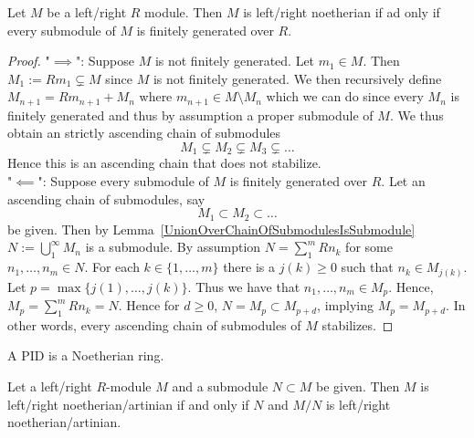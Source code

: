 \begin{theorem}\label{NoetherianIffEverySubmoduleFinitelyGenerated}
    Let $M$ be a left/right $R$ module. Then $M$ is left/right noetherian if ad only if every submodule of $M$ is finitely generated over $R$.
\end{theorem}
\begin{proof}
    "$\implies$": Suppose $M$ is not finitely generated. Let $m_1\in M$. Then $M_1:= Rm_1 \subsetneq M$ since $M$ is not finitely generated. We then recursively define $M_{n+1} = Rm_{n+1} +M_n$ where $m_{n+1}\in M\setminus M_n$ which we can do since every $M_n$ is finitely generated and thus by assumption a proper submodule of $M$. We thus obtain an strictly ascending chain of submodules
    $$M_1\subsetneq M_2\subsetneq M_3\subsetneq \dots$$
    Hence this is an ascending chain that does not stabilize.\\
    "$\impliedby$": Suppose every submodule of $M$ is finitely generated over $R$. Let an ascending chain of submodules, say
    $$M_1\subset M_2\subset \dots$$
    be given. Then by Lemma~\ref{UnionOverChainOfSubmodulesIsSubmodule} $N:=\bigcup_{1}^\infty M_n$ is a submodule. 
    By assumption $N = \sum_1^m Rn_k$ for some $n_1,\dots,n_m \in N$. For each $k\in \{1,\dots,m\}$ there is a $j(k)\geq 0$ such that $n_k\in M_{j(k)}$. Let 
    $p = \max\{j(1),\dots,j(k)\}$. Thus we have that $n_1,\dots, n_m\in M_p$. Hence, $M_p = \sum_1^m Rn_k = N$. Hence for $d\geq 0$, $N=M_p \subset M_{p+d} $, implying $M_p = M_{p+d}$. In other words, every ascending chain of submodules of $M$ stabilizes.
\end{proof}
\begin{corollary}
    A PID is a Noetherian ring.
\end{corollary}
\begin{lemma}\label{ModuleNoetherianIffQuotientModuleAndSubModuleNoetherian}
    Let a left/right $R$-module $M$ and a submodule $N\subset M$ be given. Then $M$ is left/right noetherian/artinian if and only if $N$ and $M/N$ is left/right noetherian/artinian. 
\end{lemma}
